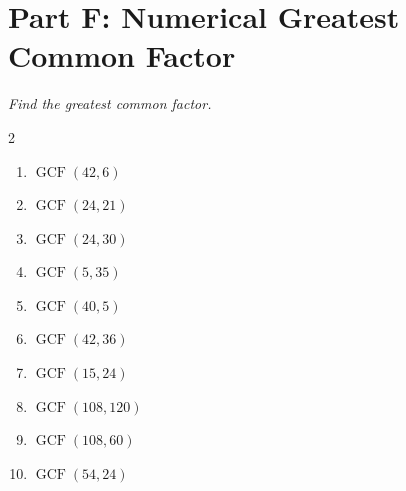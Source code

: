 \documentclass[11pt]{article}
\begin{document}
\section*{Part F: Numerical Greatest Common Factor}
\noindent\textit{Find the greatest common factor.}
\begin{multicols}{2}
\begin{enumerate}
  \item $\operatorname{GCF}\left(42, 6\right)$
  \vspace{1.0cm}
  \item $\operatorname{GCF}\left(24, 21\right)$
  \vspace{1.0cm}
  \item $\operatorname{GCF}\left(24, 30\right)$
  \vspace{1.0cm}
  \item $\operatorname{GCF}\left(5, 35\right)$
  \vspace{1.0cm}
  \item $\operatorname{GCF}\left(40, 5\right)$
  \vspace{1.0cm}
  \item $\operatorname{GCF}\left(42, 36\right)$
  \vspace{1.0cm}
  \item $\operatorname{GCF}\left(15, 24\right)$
  \vspace{1.0cm}
  \item $\operatorname{GCF}\left(108, 120\right)$
  \vspace{1.0cm}
  \item $\operatorname{GCF}\left(108, 60\right)$
  \vspace{1.0cm}
  \item $\operatorname{GCF}\left(54, 24\right)$
  \vspace{1.0cm}
\end{enumerate}
\end{multicols}
\end{document}
